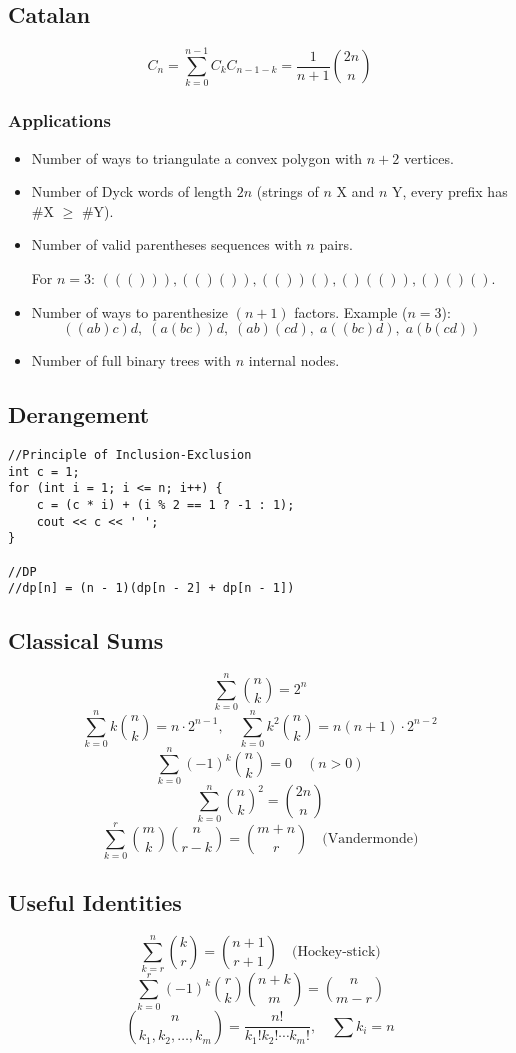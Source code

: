\documentclass[11pt,a4paper]{article}
\begin{document}
\begin{multicols*}{2}
\subsection{Catalan}
\[
C_n = \sum_{k=0}^{n-1} C_k C_{n-1-k} 
    = \frac{1}{n+1} \binom{2n}{n}
\]

\subsubsection*{Applications}
\begin{itemize}
  \item Number of ways to triangulate a convex polygon with $n+2$ vertices.
  \item Number of Dyck words of length $2n$ (strings of $n$ X and $n$ Y, every prefix has \#X $\ge$ \#Y).
  \item Number of valid parentheses sequences with $n$ pairs. 
  
  For $n=3$: \(((())), (()()), (())(), ()(()), ()()()\).
  \item Number of ways to parenthesize $(n+1)$ factors.  
        Example ($n=3$): 
        \[ ((ab)c)d,\; (a(bc))d,\; (ab)(cd),\; a((bc)d),\; a(b(cd)) \]
  \item Number of full binary trees with $n$ internal nodes.
\end{itemize}

\subsection{Derangement}
\begin{lstlisting}
//Principle of Inclusion-Exclusion
int c = 1;
for (int i = 1; i <= n; i++) {
    c = (c * i) + (i % 2 == 1 ? -1 : 1);
    cout << c << ' ';
}

//DP
//dp[n] = (n - 1)(dp[n - 2] + dp[n - 1])
\end{lstlisting}

\subsection{Classical Sums}
\[
\sum_{k=0}^n \binom{n}{k} = 2^n
\]
\[
\sum_{k=0}^n k \binom{n}{k} = n \cdot 2^{n-1}, 
\quad
\sum_{k=0}^n k^2 \binom{n}{k} = n(n+1) \cdot 2^{n-2}
\]
\[
\sum_{k=0}^n (-1)^k \binom{n}{k} = 0 \quad (n>0)
\]
\[
\sum_{k=0}^n \binom{n}{k}^2 = \binom{2n}{n}
\]
\[
\sum_{k=0}^r \binom{m}{k}\binom{n}{r-k} = \binom{m+n}{r} \quad \text{(Vandermonde)}
\]

\subsection{Useful Identities}
\[
\sum_{k=r}^n \binom{k}{r} = \binom{n+1}{r+1}
\quad \text{(Hockey-stick)}
\]
\[
\sum_{k=0}^r (-1)^k \binom{r}{k}\binom{n+k}{m} = \binom{n}{m-r}
\]
\[
\binom{n}{k_1, k_2, \dots, k_m} = \frac{n!}{k_1! k_2! \cdots k_m!}, 
\quad \sum k_i = n
\]


\end{multicols*}
\end{document}
